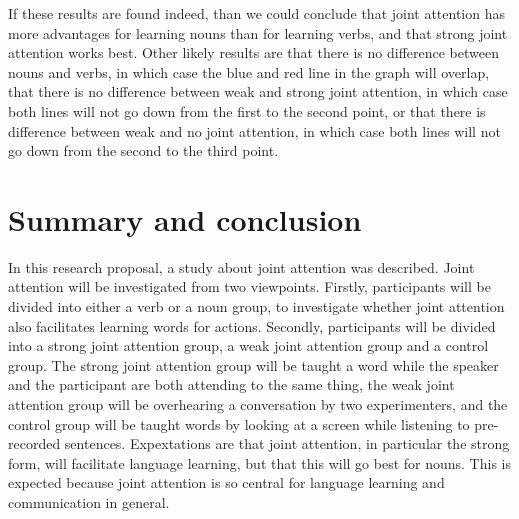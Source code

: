 \documentclass[12pt]{article}
\let\stdsection\section
\renewcommand\section{\newpage\stdsection}
\begin{document}
If these results are found indeed, than we could conclude that joint attention has more advantages for learning nouns than for learning verbs, and that strong joint attention works best. Other likely results are that there is no difference between nouns and verbs, in which case the blue and red line in the graph will overlap, that there is no difference between weak and strong joint attention, in which case both lines will not go down from the first to the second point, or that there is difference between weak and no joint attention, in which case both lines will not go down from the second to the third point.

\section{Summary and conclusion} \label{sum}
In this research proposal, a study about joint attention was described. Joint attention will be investigated from two viewpoints. Firstly, participants will be divided into either a verb or a noun group, to investigate whether joint attention also facilitates learning words for actions. Secondly, participants will be divided into a strong joint attention group, a weak joint attention group and a control group. The strong joint attention group will be taught a word while the speaker and the participant are both attending to the same thing, the weak joint attention group will be overhearing a conversation by two experimenters, and the control group will be taught words by looking at a screen while listening to pre-recorded sentences. Expextations are that joint attention, in particular the strong form, will facilitate language learning, but that this will go best for nouns. This is expected because joint attention is so central for language learning and communication in general.
\end{document}
